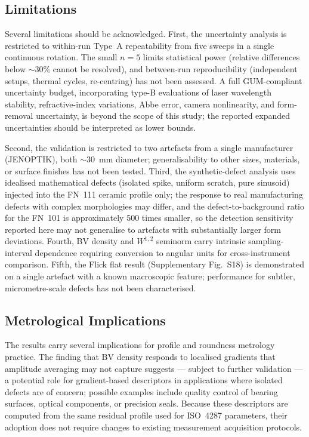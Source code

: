 \documentclass[review]{elsarticle}
\begin{document}
\subsection{Limitations}
Several limitations should be acknowledged. First, the uncertainty analysis is restricted to within-run Type~A repeatability from five sweeps in a single continuous rotation. The small $n=5$ limits statistical power (relative differences below $\sim30\%$ cannot be resolved), and between-run reproducibility (independent setups, thermal cycles, re-centring) has not been assessed. A full GUM-compliant uncertainty budget, incorporating type-B evaluations of laser wavelength stability, refractive-index variations, Abbe error, camera nonlinearity, and form-removal uncertainty, is beyond the scope of this study; the reported expanded uncertainties should be interpreted as lower bounds.

Second, the validation is restricted to two artefacts from a single manufacturer (JENOPTIK), both $\sim30$~mm diameter; generalisability to other sizes, materials, or surface finishes has not been tested. Third, the synthetic-defect analysis uses idealised mathematical defects (isolated spike, uniform scratch, pure sinusoid) injected into the FN~111 ceramic profile only; the response to real manufacturing defects with complex morphologies may differ, and the defect-to-background ratio for the FN~101 is approximately 500 times smaller, so the detection sensitivity reported here may not generalise to artefacts with substantially larger form deviations. Fourth, BV density and $W^{1,2}$ seminorm carry intrinsic sampling-interval dependence requiring conversion to angular units for cross-instrument comparison. Fifth, the Flick flat result (Supplementary Fig.~S18) is demonstrated on a single artefact with a known macroscopic feature; performance for subtler, micrometre-scale defects has not been characterised.

\subsection{Metrological Implications}
The results carry several implications for profile and roundness metrology practice. The finding that BV density responds to localised gradients that amplitude averaging may not capture suggests --- subject to further validation --- a potential role for gradient-based descriptors in applications where isolated defects are of concern; possible examples include quality control of bearing surfaces, optical components, or precision seals. Because these descriptors are computed from the same residual profile used for ISO~4287 parameters, their adoption does not require changes to existing measurement acquisition protocols.
\end{document}
